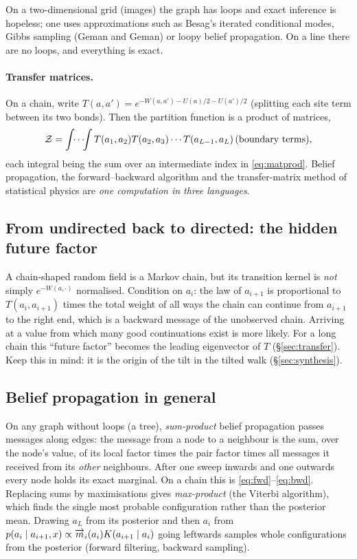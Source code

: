 On a two-dimensional grid (images) the graph has loops and exact inference is hopeless; one uses
approximations such as Besag's iterated conditional modes, Gibbs sampling (Geman and Geman) or loopy belief
propagation. On a line there are no loops, and everything is exact.

\paragraph{Transfer matrices.} On a chain, write $T(a,a')=e^{-W(a,a')-U(a)/2-U(a')/2}$ (splitting each site term
between its two bonds). Then the partition function is a product of matrices,
\[
  \mathcal{Z}=\int\!\!\cdots\!\!\int T(a_1,a_2)T(a_2,a_3)\cdots T(a_{L-1},a_L)\,(\text{boundary terms}),
\]
each integral being the sum over an intermediate index in \eqref{eq:matprod}. Belief propagation, the
forward--backward algorithm and the transfer-matrix method of statistical physics are \emph{one computation in
three languages}.

\subsection{From undirected back to directed: the hidden future factor}\label{sec:futurefactor}

A chain-shaped random field is a Markov chain, but its transition kernel is \emph{not} simply $e^{-W(a,\cdot)}$
normalised. Condition on $a_i$: the law of $a_{i+1}$ is proportional to $T(a_i,a_{i+1})$ times the total weight
of all ways the chain can continue from $a_{i+1}$ to the right end, which is a backward message of the
unobserved chain. Arriving at a value from which many good continuations exist is more likely. For a long
chain this ``future factor'' becomes the leading eigenvector of $T$ (\S\ref{sec:transfer}). Keep this in mind:
it is the origin of the tilt in the tilted walk (\S\ref{sec:synthesis}).

\subsection{Belief propagation in general}

On any graph without loops (a tree), \emph{sum-product} belief propagation passes messages along edges: the
message from a node to a neighbour is the sum, over the node's value, of its local factor times the pair
factor times all messages it received from its \emph{other} neighbours. After one sweep inwards and one
outwards every node holds its exact marginal. On a chain this is \eqref{eq:fwd}--\eqref{eq:bwd}. Replacing sums
by maximisations gives \emph{max-product} (the Viterbi algorithm), which finds the single most probable
configuration rather than the posterior mean. Drawing $a_L$ from its posterior and then $a_i$ from
$p(a_i\mid a_{i+1},x)\propto\overrightarrow{m}_i(a_i)K(a_{i+1}\mid a_i)$ going leftwards samples whole configurations from the
posterior (forward filtering, backward sampling).

